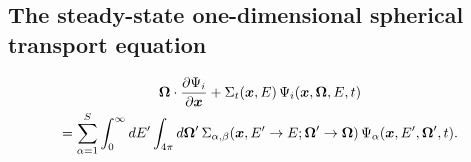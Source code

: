 \subsection{The steady-state one-dimensional spherical transport equation}
\begin{multline}
  \boldsymbol{\Omega} \cdot \dfrac{\partial \Psi_i}{\partial \boldsymbol{x}} + \Sigma_t(\boldsymbol{x},E) \, \Psi_i(\boldsymbol{x},\boldsymbol{\Omega},E,t) \\
  = \sum_{\alpha=1}^S\int_{0}^{\infty} dE^{\prime} \int_{4\pi} d \boldsymbol{\Omega}^{\prime} \, \Sigma_{\alpha,\beta}(\boldsymbol{x}, E^{\prime}\rightarrow E; \boldsymbol{\Omega}^{\prime} \rightarrow \boldsymbol{\Omega}) \, \Psi_{\alpha}(\boldsymbol{x},E^{\prime},\boldsymbol{\Omega}^{\prime},t).
\end{multline}